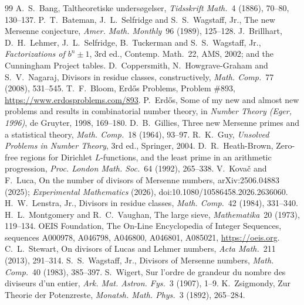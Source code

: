 \documentclass[11pt]{amsart}
\theoremstyle{definition}
\theoremstyle{remark}
\begin{document}
\begin{thebibliography}{99}
 A.~S.~Bang, Taltheoretiske unders{\o}gelser, \emph{Tidsskrift Math.}~4 (1886), 70--80, 130--137.
 P.~T.~Bateman, J.~L.~Selfridge and S.~S.~Wagstaff, Jr., The new Mersenne conjecture,
\emph{Amer. Math. Monthly}~96 (1989), 125--128.
 J.~Brillhart, D.~H.~Lehmer, J.~L.~Selfridge, B.~Tuckerman and S.~S.~Wagstaff, Jr.,
\emph{Factorizations of $b^n\pm1$}, 3rd ed., Contemp. Math.~22, AMS, 2002; and the Cunningham Project tables.
 D.~Coppersmith, N.~Howgrave-Graham and S.~V.~Nagaraj, Divisors in residue classes, constructively,
\emph{Math. Comp.}~77 (2008), 531--545.
 T.~F.~Bloom, Erd\H{o}s Problems, Problem \#893, \url{https://www.erdosproblems.com/893}.
 P.~Erd\H{o}s, Some of my new and almost new problems and results in combinatorial number theory,
in \emph{Number Theory (Eger, 1996)}, de Gruyter, 1998, 169--180.
 D.~B.~Gillies, Three new Mersenne primes and a statistical theory, \emph{Math. Comp.}~18 (1964), 93--97.
 R.~K.~Guy, \emph{Unsolved Problems in Number Theory}, 3rd ed., Springer, 2004.
 D.~R.~Heath-Brown, Zero-free regions for Dirichlet $L$-functions, and the least prime in an arithmetic
progression, \emph{Proc. London Math. Soc.}~64 (1992), 265--338.
 V.~Kova\v{c} and F.~Luca, On the number of divisors of Mersenne numbers, arXiv:2506.04883 (2025);
\emph{Experimental Mathematics} (2026), doi:10.1080/10586458.2026.2636060.
 H.~W.~Lenstra, Jr., Divisors in residue classes, \emph{Math. Comp.}~42 (1984), 331--340.
 H.~L.~Montgomery and R.~C.~Vaughan, The large sieve, \emph{Mathematika}~20 (1973), 119--134.
 OEIS Foundation, The On-Line Encyclopedia of Integer Sequences, sequences A000978, A046798, A046800,
A046801, A085021, \url{https://oeis.org}.
 C.~L.~Stewart, On divisors of Lucas and Lehmer numbers, \emph{Acta Math.}~211 (2013), 291--314.
 S.~S.~Wagstaff, Jr., Divisors of Mersenne numbers, \emph{Math. Comp.}~40 (1983), 385--397.
 S.~Wigert, Sur l'ordre de grandeur du nombre des diviseurs d'un entier, \emph{Ark. Mat. Astron. Fys.}~3
(1907), 1--9.
 K.~Zsigmondy, Zur Theorie der Potenzreste, \emph{Monatsh. Math. Phys.}~3 (1892), 265--284.
\end{thebibliography}
\end{document}
